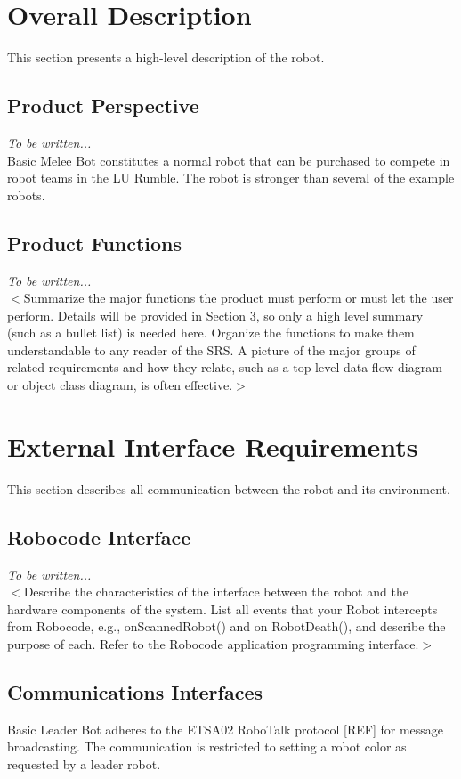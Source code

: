 \documentclass{scrreprt}
\begin{document}
\chapter{Overall Description}
This section presents a high-level description of the robot.

\section{Product Perspective}
\textit{To be written...}\\

Basic Melee Bot constitutes a normal robot that can be purchased to compete in robot teams in the LU Rumble. The robot is stronger than several of the example robots.

\section{Product Functions}
\textit{To be written...}\\

$<$Summarize the major functions the product must perform or must let the user 
perform. Details will be provided in Section 3, so only a high level summary 
(such as a bullet list) is needed here. Organize the functions to make them 
understandable to any reader of the SRS. A picture of the major groups of 
related requirements and how they relate, such as a top level data flow diagram 
or object class diagram, is often effective.$>$

\chapter{External Interface Requirements}
This section describes all communication between the robot and its environment.

\section{Robocode Interface}
\textit{To be written...}\\
$<$Describe the characteristics of the interface between the robot and the hardware components of the system. List all events that your Robot intercepts from Robocode, e.g., onScannedRobot() and on RobotDeath(), and describe the purpose of each. Refer to the Robocode application programming interface.$>$

\section{Communications Interfaces}
Basic Leader Bot adheres to the ETSA02 RoboTalk protocol [REF] for message broadcasting. The communication is restricted to setting a robot color as requested by a leader robot.\\\\
\end{document}
